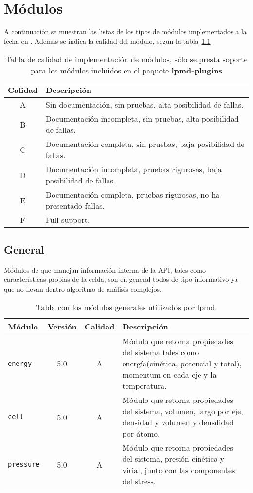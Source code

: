 \appendix

\chapter{M\'odulos}
A continuaci\'on se muestran las listas de los tipos de m\'odulos implementados a la fecha en \lpmd. Adem\'as se indica la calidad del m\'odulo, segun la tabla~\ref{tab:modquality}

\begin{table}[h!]
 \begin{tabular}{|c|l|}\hline\hline
 Calidad & Descripci\'on \\\hline\hline
 A & Sin documentaci\'on, sin pruebas, alta posibilidad de fallas. \\
 B & Documentaci\'on incompleta, sin pruebas, alta posibilidad de fallas. \\
 C & Documentaci\'on completa, sin pruebas, baja posibilidad de fallas. \\
 D & Documentaci\'on incompleta, pruebas rigurosas, baja posibilidad de fallas. \\
 E & Documentaci\'on completa, pruebas rigurosas, no ha presentado fallas. \\
 F & Full support. \\\hline\hline
 \end{tabular}
 \label{tab:modquality}
 \caption{Tabla de calidad de implementaci\'on de m\'odulos, s\'olo se presta soporte para los m\'odulos incluidos en el paquete \textbf{lpmd-plugins}}
\end{table}


\section{General}
M\'odulos de \lpmd que manejan informaci\'on interna de la API, tales como caracter\'isticas propias de la celda, son en general todos de tipo informativo ya que no llevan dentro algoritmo de an\'alisis complejos.

\begin{table}[h!]
\centering
 \begin{tabular}{|l|c|c|p{10cm}|}\hline
 M\'odulo & Versi\'on & Calidad & Descripci\'on \\
 \hline\hline
 \texttt{energy} & 5.0 & A & M\'odulo que retorna propiedades del sistema tales como energ\'ia(cin\'etica, potencial y total), momentum en cada eje y la temperatura.\\
 \hline
 \texttt{cell} & 5.0 & A & M\'odulo que retorna propiedades del sistema, volumen, largo por eje, densidad y volumen y densdidad por \'atomo. \\
 \hline
 \texttt{pressure} & 5.0 & A & M\'odulo que retorna propiedades del sistema, presi\'on cin\'etica y virial, junto con las componentes del stress. \\
 \hline
 \end{tabular}
\label{tab:modgeneral}
\caption{Tabla con los m\'odulos generales utilizados por lpmd.}
\end{table}

